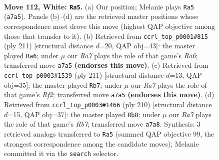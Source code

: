 \documentclass[11pt]{article}
\begin{document}
\clearpage

\begin{figure}[p]\centering
\begin{subfigure}{0.46\textwidth}\centering
\resizebox{\linewidth}{!}{%
\newchessgame
\chessboard[
  setfen={8/R5pk/5p2/7p/N6P/6PK/4r3/8 w - - 48 112},
  showmover=false,
  pgfstyle=straightmove, color=movearrow, markmove={a7-a5}
]}
\caption{}
\end{subfigure}\hfill
\begin{subfigure}{0.46\textwidth}\centering
\resizebox{\linewidth}{!}{%
\newchessgame
\chessboard[
  setfen={8/5pk1/5p2/7P/6P1/r4PK1/8/1R6 b - - 46 106},
  showmover=false,
  pgfstyle=straightmove, color=movearrow, markmove={a3-a6}
]}
\caption{}
\end{subfigure}
\\[4pt]
\begin{subfigure}{0.46\textwidth}\centering
\resizebox{\linewidth}{!}{%
\newchessgame
\chessboard[
  setfen={2R5/5r2/6pk/7p/7P/5PP1/5K2/8 b - - 79 106},
  showmover=false,
  pgfstyle=straightmove, color=movearrow, markmove={f7-b7}
]}
\caption{}
\end{subfigure}\hfill
\begin{subfigure}{0.46\textwidth}\centering
\resizebox{\linewidth}{!}{%
\newchessgame
\chessboard[
  setfen={8/1R3pk1/4p3/4P1P1/4KP2/r7/8/8 w - - 27 106},
  showmover=false,
  pgfstyle=straightmove, color=movearrow, markmove={b7-b8}
]}
\caption{}
\end{subfigure}
\caption{\textbf{Move 112, White: \texttt{Ra5}.} (a) Our position; Melanie plays \texttt{Ra5} (\texttt{a7a5}). Panels (b)--(d) are the retrieved master positions whose correspondence most drove this move (highest QAP objective among those that transfer to it). (b) Retrieved from \texttt{ccrl\_top\_p0001\#815} (ply 211) [structural distance $d$=20, QAP obj=43]: the master played \texttt{Ra6}; under $\mu$ our \emph{Ra7} plays the role of that game's \emph{Ra6}; transferred move \texttt{a7a5} \textbf{(endorses this move)}. (c) Retrieved from \texttt{ccrl\_top\_p0003\#1539} (ply 211) [structural distance $d$=13, QAP obj=35]: the master played \texttt{Rb7}; under $\mu$ our \emph{Ra7} plays the role of that game's \emph{Rf2}; transferred move \texttt{a7a5} \textbf{(endorses this move)}. (d) Retrieved from \texttt{ccrl\_top\_p0003\#1466} (ply 210) [structural distance $d$=15, QAP obj=37]: the master played \texttt{Rb8}; under $\mu$ our \emph{Ra7} plays the role of that game's \emph{Rb7}; transferred move \texttt{a7a8}. Synthesis: 3 retrieved analogs transferred to \texttt{Ra5} (summed QAP objective 99, the strongest correspondence among the candidate moves); Melanie committed it via the \texttt{search} selector.}
\label{fig:thought-m222}
\end{figure}
\end{document}

